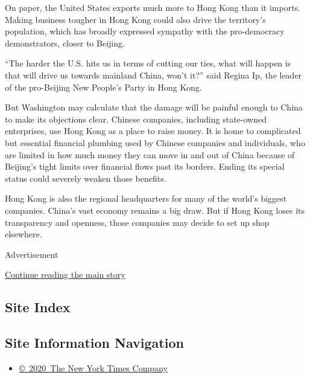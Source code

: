 On paper, the United States exports much more to Hong Kong than it
imports. Making business tougher in Hong Kong could also drive the
territory's population, which has broadly expressed sympathy with the
pro-democracy demonstrators, closer to Beijing.

``The harder the U.S. hits us in terms of cutting our ties, what will
happen is that will drive us towards mainland China, won't it?'' said
Regina Ip, the leader of the pro-Beijing New People's Party in Hong
Kong.

But Washington may calculate that the damage will be painful enough to
China to make its objections clear. Chinese companies, including
state-owned enterprises, use Hong Kong as a place to raise money. It is
home to complicated but essential financial plumbing used by Chinese
companies and individuals, who are limited in how much money they can
move in and out of China because of Beijing's tight limits over
financial flows past its borders. Ending its special status could
severely weaken those benefits.

Hong Kong is also the regional headquarters for many of the world's
biggest companies. China's vast economy remains a big draw. But if Hong
Kong loses its transparency and openness, those companies may decide to
set up shop elsewhere.

Advertisement

\protect\hyperlink{after-bottom}{Continue reading the main story}

\hypertarget{site-index}{%
\subsection{Site Index}\label{site-index}}

\hypertarget{site-information-navigation}{%
\subsection{Site Information
Navigation}\label{site-information-navigation}}

\begin{itemize}
\tightlist
\item
  \href{https://help.nytimes3xbfgragh.onion/hc/en-us/articles/115014792127-Copyright-notice}{©~2020~The
  New York Times Company}
\end{itemize}

